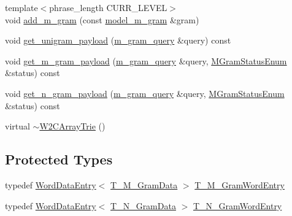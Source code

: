\begin{DoxyCompactItemize}
\item 
{\footnotesize template$<$phrase\+\_\+length C\+U\+R\+R\+\_\+\+L\+E\+V\+E\+L$>$ }\\void \hyperlink{classuva_1_1smt_1_1bpbd_1_1server_1_1lm_1_1_w2_c_array_trie_a139858f0dde1e0a01507b9599bd49eac}{add\+\_\+m\+\_\+gram} (const \hyperlink{classuva_1_1smt_1_1bpbd_1_1server_1_1lm_1_1m__grams_1_1model__m__gram}{model\+\_\+m\+\_\+gram} \&gram)
\item 
void \hyperlink{classuva_1_1smt_1_1bpbd_1_1server_1_1lm_1_1_w2_c_array_trie_a6e4f6d7e825f4ba87e1479a4459083ea}{get\+\_\+unigram\+\_\+payload} (\hyperlink{classuva_1_1smt_1_1bpbd_1_1server_1_1lm_1_1m__gram__query}{m\+\_\+gram\+\_\+query} \&query) const 
\item 
void \hyperlink{classuva_1_1smt_1_1bpbd_1_1server_1_1lm_1_1_w2_c_array_trie_acb1fe0678f20d7ba4f154f4d1a24d135}{get\+\_\+m\+\_\+gram\+\_\+payload} (\hyperlink{classuva_1_1smt_1_1bpbd_1_1server_1_1lm_1_1m__gram__query}{m\+\_\+gram\+\_\+query} \&query, \hyperlink{namespaceuva_1_1smt_1_1bpbd_1_1server_1_1lm_ab9b3e7382b561dcb8abcd6b55e9b796a}{M\+Gram\+Status\+Enum} \&status) const 
\item 
void \hyperlink{classuva_1_1smt_1_1bpbd_1_1server_1_1lm_1_1_w2_c_array_trie_a0266c47ab7e65c4dc08a8a1142273d11}{get\+\_\+n\+\_\+gram\+\_\+payload} (\hyperlink{classuva_1_1smt_1_1bpbd_1_1server_1_1lm_1_1m__gram__query}{m\+\_\+gram\+\_\+query} \&query, \hyperlink{namespaceuva_1_1smt_1_1bpbd_1_1server_1_1lm_ab9b3e7382b561dcb8abcd6b55e9b796a}{M\+Gram\+Status\+Enum} \&status) const 
\item 
virtual \hyperlink{classuva_1_1smt_1_1bpbd_1_1server_1_1lm_1_1_w2_c_array_trie_a69943d19343c795f4e36299cd03645c2}{$\sim$\+W2\+C\+Array\+Trie} ()
\end{DoxyCompactItemize}
\subsection*{Protected Types}
\begin{DoxyCompactItemize}
\item 
typedef \hyperlink{classuva_1_1smt_1_1bpbd_1_1server_1_1lm_1_1_w2_c_array_trie_1_1_word_data_entry}{Word\+Data\+Entry}$<$ \hyperlink{namespaceuva_1_1smt_1_1bpbd_1_1server_1_1lm_1_1_____w2_c_array_trie_a4d413639b142daeda71cdadbf01c2b87}{T\+\_\+\+M\+\_\+\+Gram\+Data} $>$ \hyperlink{classuva_1_1smt_1_1bpbd_1_1server_1_1lm_1_1_w2_c_array_trie_ae7c0abfe284068abf738511b29dfc727}{T\+\_\+\+M\+\_\+\+Gram\+Word\+Entry}
\item 
typedef \hyperlink{classuva_1_1smt_1_1bpbd_1_1server_1_1lm_1_1_w2_c_array_trie_1_1_word_data_entry}{Word\+Data\+Entry}$<$ \hyperlink{namespaceuva_1_1smt_1_1bpbd_1_1server_1_1lm_1_1_____w2_c_array_trie_aab5ccfad98e04de52009d53b4b55c9f1}{T\+\_\+\+N\+\_\+\+Gram\+Data} $>$ \hyperlink{classuva_1_1smt_1_1bpbd_1_1server_1_1lm_1_1_w2_c_array_trie_a906d0b9e5c49f66de0788d5c9a7324f7}{T\+\_\+\+N\+\_\+\+Gram\+Word\+Entry}
\end{DoxyCompactItemize}
